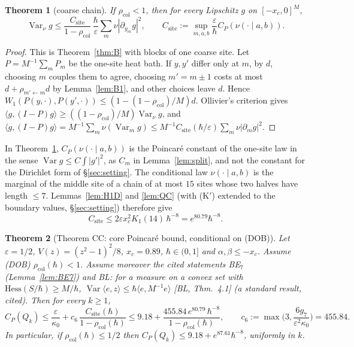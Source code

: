 \documentclass[11pt,a4paper]{article}
\newtheorem{theorem}{Theorem}[section]
\theoremstyle{definition}
\theoremstyle{remark}
\newcommand{\Var}{\operatorname{Var}}
\newcommand{\xc}{x_c}
\newcommand{\rcol}{\rho_{\mathrm{col}}}
\newcommand{\Csite}{C_{\mathrm{site}}}
\begin{document}
\begin{theorem}[coarse chain]\label{thm:C}
If $\rcol<1$, then for every Lipschitz $g$ on $[-\xc,0]^M$,
\[
\Var_\nu g\le\frac{\Csite}{1-\rcol}\,\frac{\hbar}{\varepsilon}\sum_m\nu|\partial_{y_m}g|^2,\qquad \Csite:=\sup_{m,a,b}\frac{\varepsilon}{\hbar}C_P(\nu(\cdot\mid a,b)).
\]
\end{theorem}
\begin{proof}
This is Theorem~\ref{thm:B} with blocks of one coarse site. Let $P=M^{-1}\sum_mP_m$ be the one-site heat bath. If $y,y'$ differ only at $m$, by $d$, choosing $m$ couples them to agree, choosing $m'=m\pm1$ costs at most $d+\rho_{m'\leftarrow m}d$ by Lemma~\ref{lem:B1}, and other choices leave $d$. Hence $W_1(P(y,\cdot),P(y',\cdot))\le(1-(1-\rcol)/M)d$. Ollivier's criterion gives $\langle g,(I-P)g\rangle\ge((1-\rcol)/M)\Var_\nu g$, and $\langle g,(I-P)g\rangle=M^{-1}\sum_m\nu(\Var_mg)\le M^{-1}\Csite(\hbar/\varepsilon)\sum_m\nu|\partial_mg|^2$.
\end{proof}

In Theorem~\ref{thm:C}, $C_P(\nu(\cdot\mid a,b))$ is the Poincar\'e constant of the one-site law in the sense $\Var g\le C\int|g'|^2$, as $C_m$ in Lemma~\ref{lem:split}, and not the constant for the Dirichlet form of \S\ref{sec:setting}. The conditional law $\nu(\cdot\mid a,b)$ is the marginal of the middle site of a chain of at most $15$ sites whose two halves have length $\le7$. Lemmas~\ref{lem:H1D} and \ref{lem:QC} (with (K$'$) extended to the boundary values, \S\ref{sec:setting}) therefore give
\begin{equation}\label{eq:Csite}
\Csite\le2\varepsilon\xc^2K_1(14)\,\hbar^{-8}=e^{80.79}\hbar^{-8}.
\end{equation}

\begin{theorem}[Theorem CC: core Poincar\'e bound, conditional on (DOB)]\label{thm:CC}
Let $\varepsilon=1/2$, $V(z)=(z^2-1)^2/8$, $\xc=0.89$, $\hbar\in(0,1]$ and $\alpha,\beta\le-\xc$. Assume
\textup{(DOB)} $\rcol(\hbar)<1$.
Assume moreover the cited statements \textup{BE}$_7$ \textup{(}Lemma~\ref{lem:BE7}\textup{)} and \textup{BL}: for a measure on a convex set with $\mathrm{Hess}(S/\hbar)\ge M/\hbar$, $\Var\langle e,z\rangle\le\hbar\langle e,M^{-1}e\rangle$ [BL, Thm.~4.1] \textup{(}a standard result, cited\textup{)}. Then for every $k\ge1$,
\[
C_P(Q_k)\le\frac{\varepsilon}{\kappa_0}+c_6\,\frac{\Csite(\hbar)}{1-\rcol(\hbar)}\le 9.18+\frac{455.84\,e^{80.79}\,\hbar^{-8}}{1-\rcol(\hbar)},\qquad c_6:=\max\Big(3,\frac{6g_7}{\varepsilon^2\kappa_0}\Big)=455.84 .
\]
In particular, if $\rcol(\hbar)\le1/2$ then $C_P(Q_k)\le9.18+e^{87.61}\hbar^{-8}$, uniformly in $k$.
\end{theorem}
\end{document}
